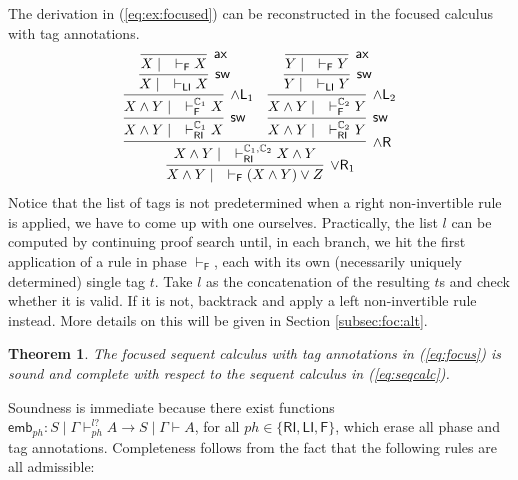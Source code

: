 \documentclass[submission,copyright,creativecommons]{eptcs}
\newtheorem{theorem}{Theorem}[section]
\theoremstyle{definition}
\newcommand{\andlone}{\land \mathsf{L}_{1}}
\newcommand{\andltwo}{\land \mathsf{L}_{2}}
\newcommand{\andr}{\land \mathsf{R}}
\newcommand{\orrone}{\lor \mathsf{R}_{1}}
\newcommand{\ax}{\mathsf{ax}}
\newcommand{\RI}{\mathsf{RI}}
\newcommand{\LI}{\mathsf{LI}}
\newcommand{\F}{\mathsf{F}}
\newcommand{\sw}{\mathsf{sw}}
\newcommand{\tCone}{\mathbb{C}_1}
\newcommand{\tCtwo}{\mathbb{C}_2}
\begin{document}
The derivation in (\ref{eq:ex:focused}) can be reconstructed in the focused calculus with tag annotations.
\begin{equation}\label{eq:ex:tag:focused}
  \begin{array}{c}
  \infer[\orrone]{X \land Y \mid \quad \vdash_{\F} (X \land Y) \lor Z}{
    \infer[\andr]{X \land Y \mid \quad \vdash^{\tCone , \tCtwo}_{\RI} X \land Y}{
      \infer[\sw]{X \land Y \mid \quad \vdash^{\tCone}_{\RI} X}{
        \infer[\andlone]{X \land Y \mid \quad \vdash^{\tCone}_{\F} X}{
          \infer[\sw]{X \mid \quad \vdash_{\LI} X}{
            \infer[\ax]{X \mid \quad \vdash_{\F} X}{}
          }
        }
      }
      &
      \infer[\sw]{X \land Y \mid \quad \vdash^{\tCtwo}_{\RI} Y}{
        \infer[\andltwo]{X \land Y \mid \quad \vdash^{\tCtwo}_{\F} Y}{
          \infer[\sw]{Y \mid \quad \vdash_{\LI} Y}{
            \infer[\ax]{Y \mid \quad \vdash_{\F} Y}{}
          }
        }
      }
    }
  }
  \end{array}
\end{equation}
Notice that the list of tags is not predetermined when a right non-invertible rule is applied, we have to come up with one ourselves.
Practically, the list $l$ can be computed by continuing proof search until, in each branch, we hit the first application of a rule in phase $\vdash_\F$, each with its own (necessarily uniquely determined) single tag $t$. Take $l$ as the concatenation of the resulting $t$s and check whether it is valid. If it is not, backtrack and apply a left non-invertible rule instead. More details on this will be given in Section \ref{subsec:foc:alt}.
\begin{theorem}\label{theorem:focus:sound:complete}
  The focused sequent calculus with tag annotations in (\ref{eq:focus}) is sound and complete with respect to the sequent calculus in (\ref{eq:seqcalc}).
\end{theorem}
Soundness is immediate because there exist functions $\mathsf{emb}_{ph} : S \mid \Gamma \vdash^{l?}_{ph} A \to S \mid \Gamma \vdash A$, for all $ph \in \{ \RI , \LI , \F \}$, which erase all phase and tag annotations.
Completeness follows from the fact that the following rules are all admissible:
\end{document}

